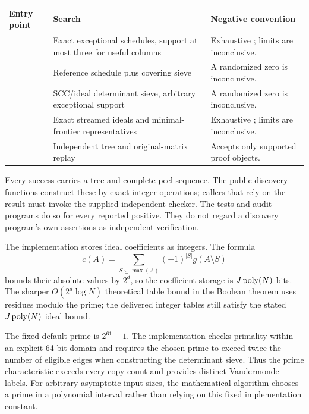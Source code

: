 \begin{center}
\begin{tabular}{P{0.31\textwidth}P{0.32\textwidth}P{0.26\textwidth}}
\toprule
Entry point & Search & Negative convention\\
\midrule
{} & Exact exceptional schedules, support at most three
for useful columns & Exhaustive ; limits are inconclusive.\\
 & Reference schedule plus covering sieve
& A randomized zero is inconclusive.\\
 & SCC/ideal determinant sieve, arbitrary
exceptional support & A randomized zero is inconclusive.\\
 & Exact streamed ideals and minimal-frontier
representatives & Exhaustive ; limits are inconclusive.\\
 & Independent tree and original-matrix replay
& Accepts only supported proof objects.\\
\bottomrule
\end{tabular}
\end{center}

Every success carries a tree and complete peel sequence.  The public
discovery functions construct these by exact integer operations; callers
that rely on the result must invoke the supplied independent checker.
The tests and audit programs do so for every reported positive.  They do
not regard a discovery program's own assertions as independent verification.

The implementation stores ideal coefficients as integers.  The formula
\[
 c(A)=\sum_{S\subseteq\max(A)}(-1)^{|S|}g(A\setminus S)
\]
bounds their
absolute values by $2^d$, so the coefficient storage is
$J\operatorname{poly}(N)$ bits.  The sharper $O(2^d\log N)$ theoretical table bound
in the Boolean theorem uses residues modulo the prime; the delivered
integer tables still satisfy the stated $J\operatorname{poly}(N)$ ideal bound.

The fixed default prime is $2^{61}-1$.  The implementation checks primality
within an explicit 64-bit domain and requires the chosen prime to exceed
twice the number of eligible edges when constructing the determinant
sieve.  Thus the prime characteristic exceeds every copy count and provides
distinct Vandermonde labels.  For arbitrary asymptotic input sizes, the
mathematical algorithm chooses a prime in a polynomial interval rather
than relying on this fixed implementation constant.

